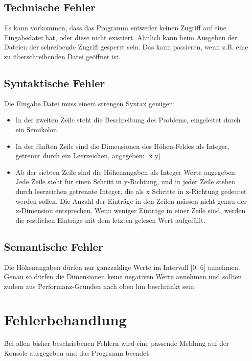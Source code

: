 \subsection{Technische Fehler}\label{subsec:technische-fehler}
Es kann vorkommen, dass das Programm entweder keinen Zugriff auf eine Eingabedatei hat, oder diese nicht existiert.
Ähnlich kann beim Ausgeben der Dateien der schreibende Zugriff gesperrt sein.
Das kann passieren, wenn z.B. eine zu überschreibenden Datei geöffnet ist.

\subsection{Syntaktische Fehler}\label{subsec:syntaktische-fehler}
Die Eingabe Datei muss einem strengen Syntax genügen:
\begin{itemize}[noitemsep]
    \item In der zweiten Zeile steht die Beschreibung des Problems, eingeleitet durch ein Semikolon
    \item In der fünften Zeile sind die Dimensionen des Höhen-Feldes als Integer, getrennt durch ein Leerzeichen, angegeben: [x y]
    \item Ab der siebten Zeile sind die Höhenangaben als Integer Werte angegeben.
    Jede Zeile steht für einen Schritt in y-Richtung, und in jeder Zeile stehen durch leerzeichen getrennte Integer, die als x Schritte in x-Richtung gedeutet werden sollen.
    Die Anzahl der Einträge in den Zeilen müssen nicht genau der x-Dimension entsprechen.
    Wenn weniger Einträge in einer Zeile sind, werden die restlichen Einträge mit dem letzten gelesen Wert aufgefüllt.
\end{itemize}

\subsection{Semantische Fehler}\label{subsec:semantische-fehler}
Die Höhenangaben dürfen nur ganzzahlige Werte im Intervall [0, 6] annehmen.
Genau so dürfen die Dimensionen keine negativen Werte annehmen und sollten zudem aus Performanz-Gründen nach oben hin beschränkt sein.

\section{Fehlerbehandlung}\label{sec:fehlerbehandlung}
Bei allen bisher beschriebenen Fehlern wird eine passende Meldung auf der Konsole ausgegeben und das Programm beendet.

